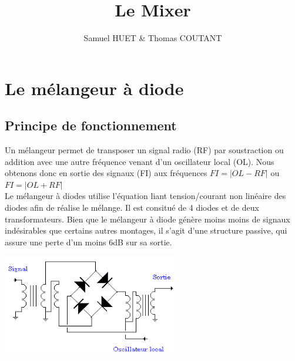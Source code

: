 \documentclass[a4paper,12pt]{report}            %
\author{Samuel HUET \& Thomas COUTANT}
\title{\huge{Le Mixer}}
\begin{document}
\maketitle
\renewcommand{\contentsname}{SOMMAIRE} %
\tableofcontents

\chapter{Le mélangeur à diode}

\section{Principe de fonctionnement}
    Un mélangeur permet de transposer un signal radio (RF) par soustraction ou addition avec
une autre fréquence venant d'un oscillateur local (OL). Nous obtenons donc en sortie des
signaux (FI) aux fréquences $FI = |OL - RF|$ ou $FI = |OL + RF|$\\
    Le mélangeur à diodes utilise l'équation liant tension/courant non linéaire
des diodes afin de réalise le mélange. Il est consitué de 4 diodes et de deux transformateurs.
Bien que le mélangeur à diode génère moins moins de signaux indésirables que certains autres montages,
il s'agit d'une structure passive, qui assure une perte d'un moins 6dB sur sa sortie.\\
\begin{center}\includegraphics[scale = 1]{pic/schema_mixer.png}\\ \end{center}
\end{document}
